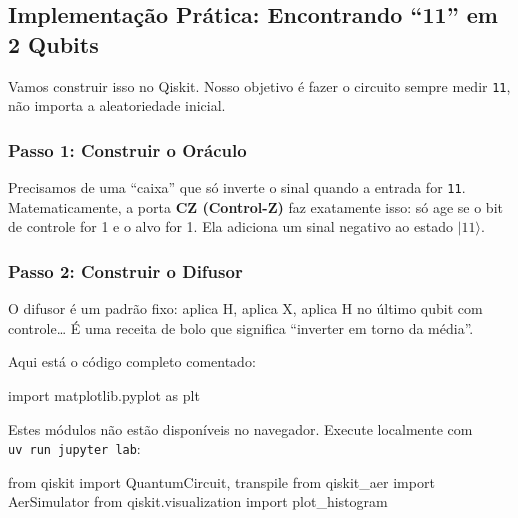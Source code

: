 \documentclass[
  brazilian,
]{report}
\newenvironment{Shaded}{\begin{snugshade}}{\end{snugshade}}
\newcommand{\ImportTok}[1]{\textcolor[rgb]{0.00,0.46,0.62}{#1}}
\newcommand{\NormalTok}[1]{\textcolor[rgb]{0.00,0.23,0.31}{#1}}
\begin{document}
\subsection{Implementação Prática: Encontrando ``11'' em 2
Qubits}\label{implementauxe7uxe3o-pruxe1tica-encontrando-11-em-2-qubits}

Vamos construir isso no Qiskit. Nosso objetivo é fazer o circuito sempre
medir \texttt{11}, não importa a aleatoriedade inicial.

\subsubsection{Passo 1: Construir o
Oráculo}\label{passo-1-construir-o-oruxe1culo}

Precisamos de uma ``caixa'' que só inverte o sinal quando a entrada for
\texttt{11}. Matematicamente, a porta \textbf{CZ (Control-Z)} faz
exatamente isso: só age se o bit de controle for 1 e o alvo for 1. Ela
adiciona um sinal negativo ao estado \(|11\rangle\).

\subsubsection{Passo 2: Construir o
Difusor}\label{passo-2-construir-o-difusor}

O difusor é um padrão fixo: aplica H, aplica X, aplica H no último qubit
com controle\ldots{} É uma receita de bolo que significa ``inverter em
torno da média''.

Aqui está o código completo comentado:

\begin{Shaded}
\begin{Highlighting}[]
\NormalTok{import matplotlib.pyplot as plt}
\end{Highlighting}
\end{Shaded}

\begin{tcolorbox}[enhanced jigsaw, arc=.35mm, bottomrule=.15mm, bottomtitle=1mm, breakable, colback=white, colbacktitle=quarto-callout-note-color!10!white, colframe=quarto-callout-note-color-frame, coltitle=black, left=2mm, leftrule=.75mm, opacityback=0, opacitybacktitle=0.6, rightrule=.15mm, title=\textcolor{quarto-callout-note-color}{\faInfo}\hspace{0.5em}{🔒 Imports do Qiskit (requerem execução local)}, titlerule=0mm, toprule=.15mm, toptitle=1mm]

Estes módulos não estão disponíveis no navegador. Execute localmente com
\texttt{uv\ run\ jupyter\ lab}:

\begin{Shaded}
\begin{Highlighting}[]
\ImportTok{from}\NormalTok{ qiskit }\ImportTok{import}\NormalTok{ QuantumCircuit, transpile}
\ImportTok{from}\NormalTok{ qiskit\_aer }\ImportTok{import}\NormalTok{ AerSimulator}
\ImportTok{from}\NormalTok{ qiskit.visualization }\ImportTok{import}\NormalTok{ plot\_histogram}
\end{Highlighting}
\end{Shaded}

\end{tcolorbox}
\end{document}
